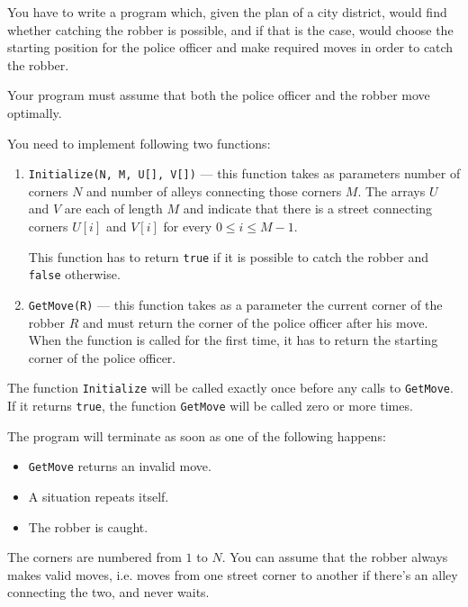 \documentclass{boi2014}
\newcommand{\method}[1]{{\tt #1}}
\newcommand{\constant}[1]{{\tt #1}}
\begin{document}
    \Task
    You have to write a program which, given the plan of a city district, would
    find whether catching the robber is possible, and if that is the case, would
    choose the starting position for the police officer and make required moves
    in order to catch the robber.
    
    Your program must assume that both the police officer and the robber move
    optimally.

    \Implementation
    You need to implement following two functions:
    \begin{enumerate}
        \item \method{Initialize(N, M, U[], V[])} --- this function takes as
        parameters number of corners $N$ and number of alleys connecting those
        corners $M$. The arrays $U$ and $V$ are each of length $M$ and indicate
        that there is a street connecting corners $U[i]$ and $V[i]$ for every $0
        \le i \le M - 1$.

        This function has to return \constant{true} if it is possible to catch
        the robber and \constant{false} otherwise.

        \item \method{GetMove(R)} --- this function takes as a parameter the
        current corner of the robber $R$ and must return the corner of the
        police officer after his move. When the function is called for the first
        time, it has to return the starting corner of the police officer.
    \end{enumerate}

    The function \method{Initialize} will be called exactly once before any
    calls to \method{GetMove}. If it returns \constant{true}, the function
    \method{GetMove} will be called zero or more times.

    The program will terminate as soon as one of the following happens:
    \begin{itemize}
        \item \method{GetMove} returns an invalid move.
        \item A situation repeats itself.
        \item The robber is caught.
    \end{itemize}

    The corners are numbered from $1$ to $N$. You can assume that the robber
    always makes valid moves, i.e. moves from one street corner to another if
    there's an alley connecting the two, and never waits.
\end{document}
